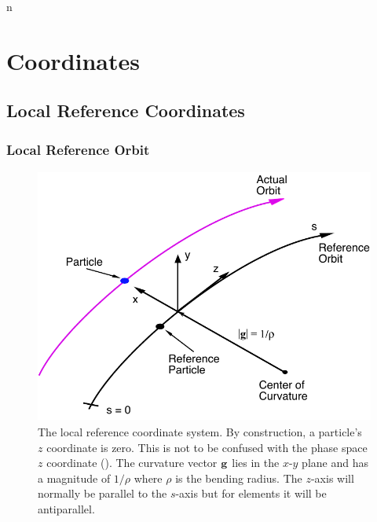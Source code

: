 n\chapter{Coordinates}

\section{Local Reference Coordinates}
\label{s:local.coords}

\subsection{Local Reference Orbit}
\label{s:ref}

\begin{figure}[!b]
  \centering
  \includegraphics[height=8.4cm]{local-coords.pdf}
  \caption[The local Reference System.]
{The local reference coordinate system. By construction, a particle's
$z$ coordinate is zero.  This is not to be confused with the phase
space $z$ coordinate (). The curvature vector
${\bf g}$ lies in the $x$-$y$ plane and has a magnitude of $1/\rho$ where
$\rho$ is the bending radius. The $z$-axis will normally be parallel
to the $s$-axis but for  elements it will be antiparallel.
}
  \label{f:local.coords}
\end{figure}

